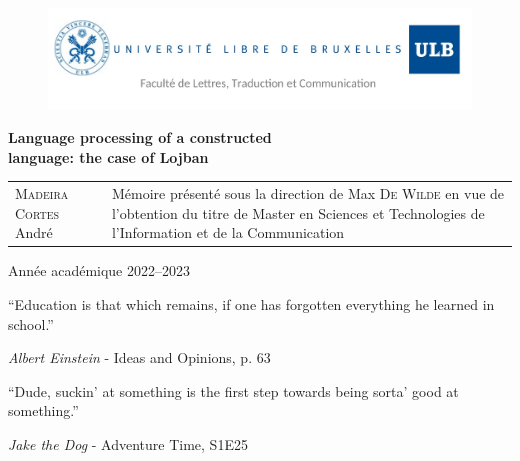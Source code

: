 

\usepackage[
    backend=bibtex, style=authortitle, defernumbers=true, backref=true, block=none, hyperref=true
]{biblatex}



\setlength{}



\begin{titlingpage}

\begin{figure}[H]
\vspace{-2cm}
\hspace{-2.5cm}
\includegraphics[scale=0.30]{images/header.png}
\end{figure}

\vfill

\begin{center}
\hspace{-0.5cm}
\Huge{\textbf{Language processing of a constructed \\language: the case of Lojban}}\\
\end{center}

\vfill

\begin{tabular}{b{6.5cm}b{7.5cm}}
\textsc{Madeira Cortes} André & Mémoire présenté sous la direction de Max \textsc{De Wilde}
en vue de l'obtention du titre de Master en Sciences et Technologies de l'Information et de la Communication\\
\end{tabular}

\vfill

\begin{center}
\Large Année académique 2022--2023
\end{center}

\end{titlingpage}

\pagestyle{empty}

\renewcommand{\epigraphsize}{\large}
\renewcommand{\epigraphwidth}{10cm}
\vspace{3cm}
\epigraph{``Education is that which remains, if one has forgotten everything he learned in school.''}{\textit{Albert Einstein} - Ideas and Opinions, p. 63}
\vspace{2cm}
\epigraph{``Dude, suckin’ at something is the first step towards being sorta' good at something.''}{\textit{Jake the Dog} - Adventure Time, S1E25}

